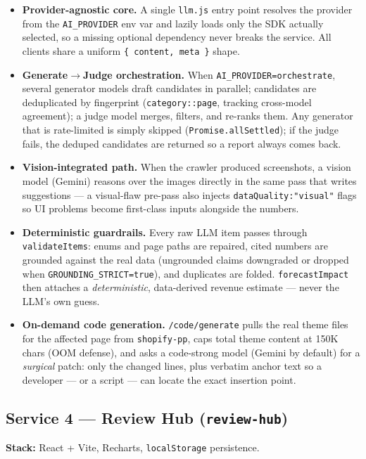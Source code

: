 \documentclass[11pt,a4paper]{article}
\begin{document}
\begin{itemize}[leftmargin=1.4em]
  \item \textbf{Provider-agnostic core.} A single \texttt{llm.js} entry point
  resolves the provider from the \texttt{AI\_PROVIDER} env var and lazily loads
  only the SDK actually selected, so a missing optional dependency never breaks
  the service. All clients share a uniform \texttt{\{ content, meta \}} shape.
  \item \textbf{Generate$\rightarrow$Judge orchestration.} When
  \texttt{AI\_PROVIDER=orchestrate}, several generator models draft candidates
  in parallel; candidates are deduplicated by fingerprint
  (\texttt{category::page}, tracking cross-model agreement); a judge model
  merges, filters, and re-ranks them. Any generator that is rate-limited is
  simply skipped (\texttt{Promise.allSettled}); if the judge fails, the deduped
  candidates are returned so a report always comes back.
  \item \textbf{Vision-integrated path.} When the crawler produced
  screenshots, a vision model (Gemini) reasons over the images directly in the
  same pass that writes suggestions --- a visual-flaw pre-pass also injects
  \texttt{dataQuality:"visual"} flags so UI problems become first-class inputs
  alongside the numbers.
  \item \textbf{Deterministic guardrails.} Every raw LLM item passes through
  \texttt{validateItems}: enums and page paths are repaired, cited numbers are
  grounded against the real data (ungrounded claims downgraded or dropped when
  \texttt{GROUNDING\_STRICT=true}), and duplicates are folded.
  \texttt{forecastImpact} then attaches a \emph{deterministic}, data-derived
  revenue estimate --- never the LLM's own guess.
  \item \textbf{On-demand code generation.} \texttt{/code/generate} pulls the
  real theme files for the affected page from \texttt{shopify-pp}, caps total
  theme content at 150K chars (OOM defense), and asks a code-strong model
  (Gemini by default) for a \emph{surgical} patch: only the changed lines, plus
  verbatim anchor text so a developer --- or a script --- can locate the exact
  insertion point.
\end{itemize}

\subsection{Service 4 --- Review Hub (\texttt{review-hub})}

\textbf{Stack:} React + Vite, Recharts, \texttt{localStorage} persistence.
\end{document}
